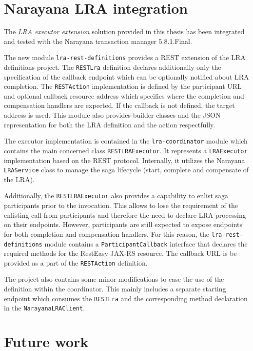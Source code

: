 \documentclass[oneside,
  digital, %
  table,   %
  nolof,     %
  nolot,     %
]{fithesis3}
\begin{document}
\section{Narayana LRA integration}
\label{sec:narayana-lra-integration}

The \textit{LRA executor extension} solution provided in this thesis has been integrated and tested with the Narayana transaction manager 5.8.1.Final.

The new module \texttt{lra-rest-definitions} provides a REST extension of the LRA definitions project. The \texttt{RESTLra} definition declares additionally only the specification of the callback endpoint which can be optionally notified about LRA completion. The \texttt{RESTAction} implementation is defined by the participant URL and optional callback resource address which specifies where the completion and compensation handlers are expected. If the callback is not defined, the target address is used. This module also provides builder classes and the JSON representation for both the LRA definition and the action respectfully.

The executor implementation is contained in the \texttt{lra-coordinator} module which contains the main concerned class \texttt{RESTLRAExecutor}. It represents a \texttt{LRAExecutor} implementation based on the REST protocol. Internally, it utilizes the Narayana \texttt{LRAService} class to manage the saga lifecycle (start, complete and compensate of the LRA).

Additionally, the \texttt{RESTLRAExecutor} also provides a capability to enlist saga participants prior to the invocation. This allows to lose the requirement of the enlisting call from participants and therefore the need to declare LRA processing on their endpoints. However, participants are still expected to expose endpoints for both completion and compensation handlers. For this reason, the \texttt{lra-rest-definitions} module contains a \texttt{ParticipantCallback} interface that declares the required methods for the RestEasy JAX-RS resource. The callback URL is be provided as a part of the \texttt{RESTAction} definition.

The project also contains some minor modifications to ease the use of the definition within the coordinator. This mainly includes a separate starting endpoint which consumes the \texttt{RESTLra} and the corresponding method declaration in the \texttt{NarayanaLRAClient}.

\section{Future work}
\end{document}
